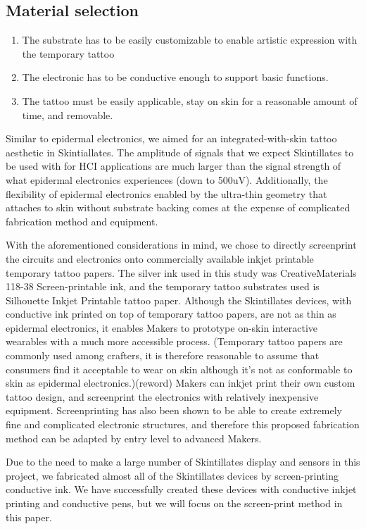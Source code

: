 \documentclass{sigchi}
\begin{document}
\subsection{Material selection}
\begin{enumerate}
  \item The substrate has to be easily customizable to enable artistic expression with the temporary tattoo
  \item The electronic has to be conductive enough to support basic functions. 
  \item The tattoo must be easily applicable, stay on skin for a reasonable amount of time, and removable.
\end{enumerate}

Similar to epidermal electronics, we aimed for an integrated-with-skin tattoo aesthetic in Skintiallates. The amplitude of signals that we expect Skintillates to be used with for HCI applications are much larger than the signal strength of what epidermal electronics experiences (down to 500uV). Additionally, the flexibility of epidermal electronics enabled by the ultra-thin geometry that attaches to skin without substrate backing comes at the expense of complicated fabrication method and equipment. 

With the aforementioned considerations in mind, we chose to directly screenprint the circuits and electronics onto commercially available inkjet printable temporary tattoo papers. The silver ink used in this study was CreativeMaterials 118-38 Screen-printable ink, and the temporary tattoo substrates used is Silhouette Inkjet Printable tattoo paper. Although the Skintillates devices, with conductive ink printed on top of temporary tattoo papers, are not as thin as epidermal electronics, it enables Makers to prototype on-skin interactive wearables with a much more accessible process. (Temporary tattoo papers are commonly used among crafters, it is therefore reasonable to assume that consumers find it acceptable to wear on skin although it’s not as conformable to skin as epidermal electronics.)(reword) Makers can inkjet print their own custom tattoo design, and screenprint the electronics with relatively inexpensive equipment. Screenprinting has also been shown to be able to create extremely fine and complicated electronic structures, and therefore this proposed fabrication method can be adapted by entry level to advanced Makers. 

Due to the need to make a large number of Skintillates display and sensors in this project, we fabricated almost all of the Skintillates devices by screen-printing conductive ink. We have successfully created these devices with conductive inkjet printing and conductive pens, but we will focus on the screen-print method in this paper. 
\end{document}
